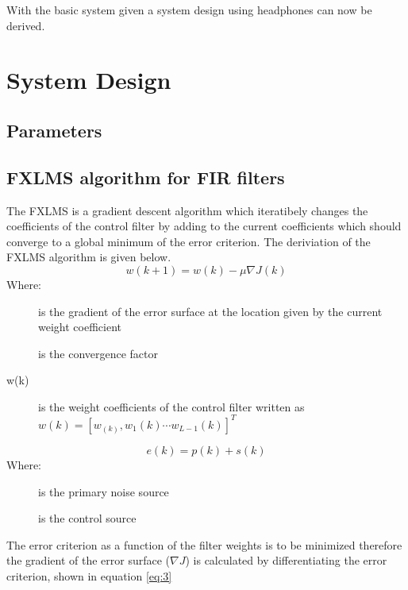 With the basic system given a system design using headphones can now be derived. 




\section{System Design} \label{sec:systemDesign}

\subsection*{Parameters}




\subsection*{FXLMS algorithm for FIR filters}\label{subsec:fxlms}
The FXLMS is a gradient descent algorithm which iteratibely changes the coefficients of the control filter by adding to the current coefficients which should converge to a global minimum of the error criterion. The deriviation of the FXLMS algorithm is given below. 
\begin{equation}\label{eq:1}
w(k+1) = w(k) - \mu\nabla J(k)
\end{equation}
Where:
\begin{description}
	\item[] is the gradient of the error surface at the location given by the current weight coefficient
	\item[\text{$\mu$}] is the convergence factor
	\item[w(k)] is the weight coefficients of the control filter written as  $w(k)=[w_(k),w_1(k) \cdots w_{L-1}(k)]^T$
\end{description}

\begin{equation}\label{eq:2}
e(k) = p(k) + s(k)
\end{equation}
Where:
\begin{description}
	\item[] is the primary noise source
	\item[] is the control source
\end{description}

The error criterion as a function of the filter weights is to be minimized therefore the gradient of the error surface ($\nabla J$) is calculated by differentiating the error criterion, shown in equation \ref{eq:3} 

